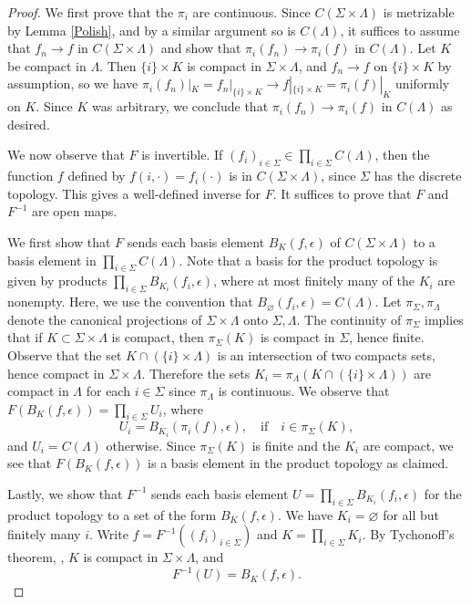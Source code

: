 \begin{proof}
	We first prove that the $\pi_i$ are continuous. Since $C(\Sigma\times\Lambda)$ is metrizable by Lemma \ref{Polish}, and by a similar argument so is $C(\Lambda)$, it suffices to assume that $f_n\to f$ in $C(\Sigma\times\Lambda)$ and show that $\pi_i(f_n)\to \pi_i(f)$ in $C(\Lambda)$. Let $K$ be compact in $\Lambda$. Then $\{i\}\times K$ is compact in $\Sigma\times\Lambda$, and $f_n\to f$ on $\{i\}\times K$ by assumption, so we have $\pi_i(f_n)|_K = f_n|_{\{i\}\times K} \to f|_{\{i\}\times K} = \pi_i(f)|_K$ uniformly on $K$. Since $K$ was arbitrary, we conclude that $\pi_i(f_n) \to \pi_i(f)$ in $C(\Lambda)$ as desired. 
	
	We now observe that $F$ is invertible. If $(f_i)_{i\in\Sigma} \in \prod_{i\in\Sigma} C(\Lambda)$, then the function $f$ defined by $f(i,\cdot) = f_i(\cdot)$ is in $C(\Sigma\times\Lambda)$, since $\Sigma$ has the discrete topology. This gives a well-defined inverse for $F$. It suffices to prove that $F$ and $F^{-1}$ are open maps.
	
	We first show that $F$ sends each basis element $B_K(f,\epsilon)$ of $C(\Sigma\times\Lambda)$ to a basis element in $\prod_{i\in\Sigma} C(\Lambda)$. Note that a basis for the product topology is given by products $\prod_{i\in\Sigma} B_{K_i}(f_i,\epsilon)$, where at most finitely many of the $K_i$ are nonempty. Here, we use the convention that $B_{\varnothing}(f_i,\epsilon) = C(\Lambda)$. Let $\pi_\Sigma,\pi_\Lambda$ denote the canonical projections of $\Sigma\times\Lambda$ onto $\Sigma,\Lambda$. The continuity of $\pi_\Sigma$ implies that if $K\subset\Sigma\times\Lambda$ is compact, then $\pi_\Sigma(K)$ is compact in $\Sigma$, hence finite. Observe that the set $K\cap(\{i\}\times\Lambda)$ is an intersection of two compacts sets, hence compact in $\Sigma\times\Lambda$. Therefore the sets $K_i = \pi_\Lambda(K\cap(\{i\}\times\Lambda))$ are compact in $\Lambda$ for each $i\in\Sigma$ since $\pi_\Lambda$ is continuous. We observe that $F(B_K(f,\epsilon)) = \prod_{i\in\Sigma} U_i$, where
	\[
	U_i = B_{K_i}(\pi_i(f),\epsilon), \quad\mathrm{if} \quad i \in \pi_\Sigma(K),
	\]
	and $U_i = C(\Lambda)$ otherwise. Since $\pi_\Sigma(K)$ is finite and the $K_i$ are compact, we see that $F(B_K(f,\epsilon))$ is a basis element in the product topology as claimed.
	
	Lastly, we show that $F^{-1}$ sends each basis element $U = \prod_{i\in\Sigma} B_{K_i}(f_i,\epsilon)$ for the product topology to a set of the form $B_K(f,\epsilon)$. We have $K_i=\varnothing$ for all but finitely many $i$. Write $f = F^{-1}((f_i)_{i\in\Sigma})$ and $K=\prod_{i\in\Sigma} K_i$. By Tychonoff's theorem, \cite[Theorem 37.3]{Munkres}, $K$ is compact in $\Sigma\times\Lambda$, and
	\[
	F^{-1}(U) = B_K(f,\epsilon).
	\]
	
\end{proof}

